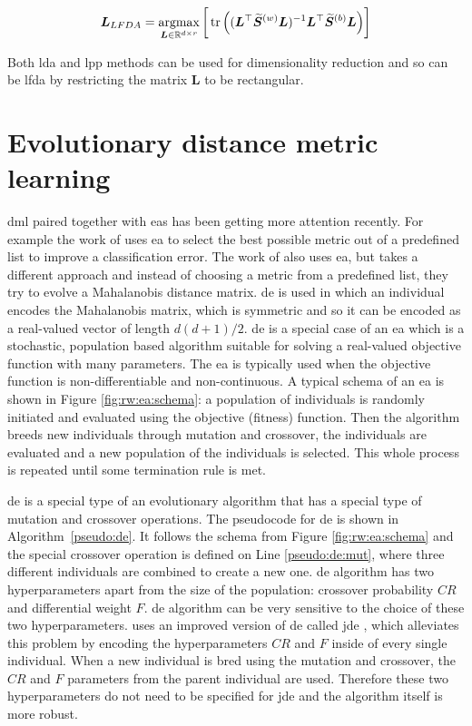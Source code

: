 \documentclass[12pt,a4paper]{report}
\begin{document}
\begin{equation}
\bm{L}_{LFDA} = \operatorname*{argmax}_{\bm{L} \in \mathbb{R}^{d \times r}} \bigg[\operatorname*{tr}\Big( ( \bm{L}^\top\widetilde{\bm{S}}^{(w)}\bm{L} )^{-1} \bm{L}^\top\widetilde{\bm{S}}^{(b)}\bm{L} \Big)\bigg] \label{eq:rw:lfda:objective}
\end{equation}

Both \ac{lda} and \ac{lpp} methods can be used for dimensionality reduction and so can be \ac{lfda} by restricting the matrix $\bm{L}$ to be rectangular.

\section{Evolutionary distance metric learning} \label{chap:rw:fukui}


\Acl{dml} paired together with \acp{ea} has been getting more attention recently. For example the work of \cite{koloseni2012optimized} uses \ac{ea} to select the best possible metric out of a predefined list to improve a classification error. The work of \cite{fukui2013evolutionary} also uses \ac{ea}, but takes a different approach and instead of choosing a metric from a predefined list, they try to evolve a Mahalanobis distance matrix. \Acl{de} is used in which an individual encodes the Mahalanobis matrix, which is symmetric and so it can be encoded as a real-valued vector of length $d(d+1)/2$. \Acl{de} is a special case of an \ac{ea} which is a stochastic, population based algorithm suitable for solving a real-valued objective function with many parameters. The \ac{ea} is typically used when the objective function is non-differentiable and non-continuous. A typical schema of an \ac{ea} is shown in Figure \ref{fig:rw:ea:schema}: a population of individuals is randomly initiated and evaluated using the objective (fitness) function. Then the algorithm breeds new individuals through mutation and crossover, the individuals are evaluated and a new population of the individuals is selected. This whole process is repeated until some termination rule is met.

\Ac{de} is a special type of an evolutionary algorithm that has a special type of mutation and crossover operations. The pseudocode for \ac{de} is shown in Algorithm~\ref{pseudo:de}. It follows the schema from Figure \ref{fig:rw:ea:schema} and the special crossover operation is defined on Line \ref{pseudo:de:mut}, where three different individuals are combined to create a new one. \ac{de} algorithm has two hyperparameters apart from the size of the population: crossover probability $CR$ and differential weight $F$. \ac{de} algorithm can be very sensitive to the choice of these two hyperparameters. \cite{fukui2013evolutionary} uses an improved version of \ac{de} called \acf{jde} \citep{brest2006self}, which alleviates this problem by encoding the hyperparameters $CR$ and $F$ inside of every single individual. When a new individual is bred using the mutation and crossover, the $CR$ and $F$ parameters from the parent individual are used. Therefore these two hyperparameters do not need to be specified for \ac{jde} and the algorithm itself is more robust.
\end{document}
